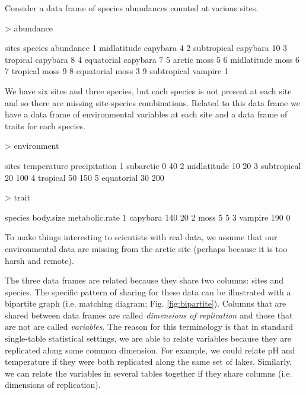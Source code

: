 \documentclass{article}
\numberwithin{exercise}{section}
\begin{document}
Consider a data frame of species abundances counted at various sites.
\begin{Schunk}
\begin{Sinput}
> abundance
\end{Sinput}
\begin{Soutput}
        sites  species abundance
1 midlatitude capybara         4
2 subtropical capybara        10
3    tropical capybara         8
4  equatorial capybara         7
5      arctic     moss         5
6 midlatitude     moss         6
7    tropical     moss         9
8  equatorial     moss         3
9 subtropical  vampire         1
\end{Soutput}
\end{Schunk}
We have six sites and three species, but each species is not present at each site and so there are missing site-species combinations.  Related to this data frame we have a data frame of environmental variables at each site and a data frame of traits for each species.
\begin{Schunk}
\begin{Sinput}
> environment
\end{Sinput}
\begin{Soutput}
        sites temperature precipitation
1   subarctic           0            40
2 midlatitude          10            20
3 subtropical          20           100
4    tropical          50           150
5  equatorial          30           200
\end{Soutput}
\begin{Sinput}
> trait
\end{Sinput}
\begin{Soutput}
   species body.size metabolic.rate
1 capybara       140             20
2     moss         5              5
3  vampire       190              0
\end{Soutput}
\end{Schunk}
To make things interesting to scientists with real data, we assume that our environmental data are missing from the arctic site (perhaps because it is too harsh and remote).

The three data frames are related because they share two columns:  sites and species.  The specific pattern of sharing for these data can be illustrated with a bipartite graph (i.e. matching diagram; Fig. \ref{fig:bipartite}).  Columns that are shared between data frames are called \emph{dimensions of replication} and those that are not are called \emph{variables}.  The reason for this terminology is that in standard single-table statistical settings, we are able to relate variables because they are replicated along some common dimension.  For example, we could relate pH and temperature if they were both replicated along the same set of lakes.  Similarly, we can relate the variables in several tables together if they share columns (i.e. dimensions of replication).
\end{document}
